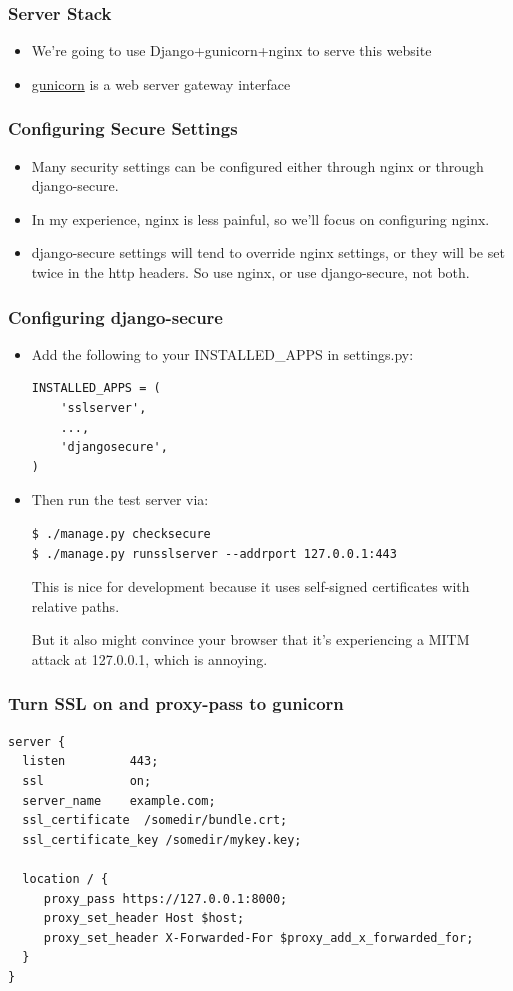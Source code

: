 \documentclass[9pt]{beamer}
\begin{document}
\begin{frame}[fragile]
\frametitle{Server Stack}
\begin{itemize}
\item We're going to use Django+gunicorn+nginx to serve this website
\pause
\item \href{http://gunicorn.org/\#deployment}{gunicorn} is a web server gateway interface
\end{itemize}
\end{frame}

\begin{frame}[fragile]
\frametitle{Configuring Secure Settings}
\begin{itemize}
\item Many security settings can be configured either through nginx or through django-secure.
\pause
\item In my experience, nginx is less painful, so we'll focus on configuring nginx.
\pause 
\item django-secure settings will tend to override nginx settings, or they will be set twice in the http headers. So use nginx, or use django-secure, not both.
\end{itemize}
\end{frame}

\begin{frame}[fragile]
\frametitle{Configuring django-secure}
\begin{itemize}
\item Add the following to your INSTALLED\_APPS in settings.py:
\begin{verbatim}
INSTALLED_APPS = (
    'sslserver',
    ...,
    'djangosecure',
)
\end{verbatim}
\pause
\item Then run the test server via:
\begin{verbatim}
$ ./manage.py checksecure 
$ ./manage.py runsslserver --addrport 127.0.0.1:443
\end{verbatim}
This is nice for development because it uses self-signed certificates with relative paths.

But it also might convince your browser that it's experiencing a MITM attack at 127.0.0.1, which is annoying.
\end{itemize}
\end{frame}

\begin{frame}[fragile]
\frametitle{Turn SSL on and proxy-pass to gunicorn}
\begin{verbatim}
server {
  listen         443;
  ssl            on;
  server_name    example.com;
  ssl_certificate  /somedir/bundle.crt;
  ssl_certificate_key /somedir/mykey.key;

  location / {
     proxy_pass https://127.0.0.1:8000;
     proxy_set_header Host $host;
     proxy_set_header X-Forwarded-For $proxy_add_x_forwarded_for;
  }
}
\end{verbatim}
\end{frame}
\end{document}
